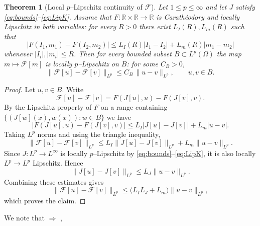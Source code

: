 \documentclass[11pt,a4paper]{article}
\theoremstyle{plain}
\newtheorem{theorem}{Theorem}[section]
\theoremstyle{definition}
\theoremstyle{remark}
\begin{document}
\begin{theorem}[Local $p$–Lipschitz continuity of $\mathcal F$]
	Let $1\le p\le\infty$ and let $J$ satisfy
	\eqref{eq:bounds}–\eqref{eq:LipK}.
	Assume that $F:\mathbb R\times\mathbb R\to\mathbb R$ is
	Carathéodory and locally Lipschitz in both variables:
	for every $R>0$ there exist $L_I(R),L_m(R)$ such that
	\[
		|F(I_1,m_1)-F(I_2,m_2)|
		\le L_I(R)|I_1-I_2| + L_m(R)|m_1-m_2|
	\]
	whenever $|I_i|,|m_i|\le R$.
	Then for every bounded subset $B\subset L^p(\Omega)$
	the map $m\mapsto \mathcal F[m]$ is locally $p$–Lipschitz on $B$:
	for some $C_B>0$,
	\[
		\|\mathcal F[u]-\mathcal F[v]\|_{L^p}
		\le C_B\,\|u-v\|_{L^p},
		\qquad u,v\in B.
	\]
\end{theorem}

\begin{proof}
	Let $u,v\in B$.  Write
	\[
		\mathcal F[u]-\mathcal F[v]
		= F(J[u],u)-F(J[v],v).
	\]
	By the Lipschitz property of $F$ on a range containing
	$\{(J[w](x),w(x)):w\in B\}$ we have
	\[
		|F(J[u],u)-F(J[v],v)|
		\le L_I |J[u]-J[v]| + L_m |u-v|.
	\]
	Taking $L^p$ norms and using the triangle inequality,
	\[
		\|\mathcal F[u]-\mathcal F[v]\|_{L^p}
		\le L_I \|J[u]-J[v]\|_{L^p} + L_m \|u-v\|_{L^p}.
	\]
	Since $J:L^p\to L^\infty$ is locally $p$–Lipschitz by
	\eqref{eq:bounds}–\eqref{eq:LipK}, it is also locally
	$L^p\to L^p$ Lipschitz.  Hence
	\[
		\|J[u]-J[v]\|_{L^p} \le L_J \|u-v\|_{L^p}.
	\]
	Combining these estimates gives
	\[
		\|\mathcal F[u]-\mathcal F[v]\|_{L^p}
		\le \bigl(L_I L_J + L_m\bigr) \|u-v\|_{L^p},
	\]
	which proves the claim.
\end{proof}

We note that
 $\Rightarrow$
,







\end{document}
